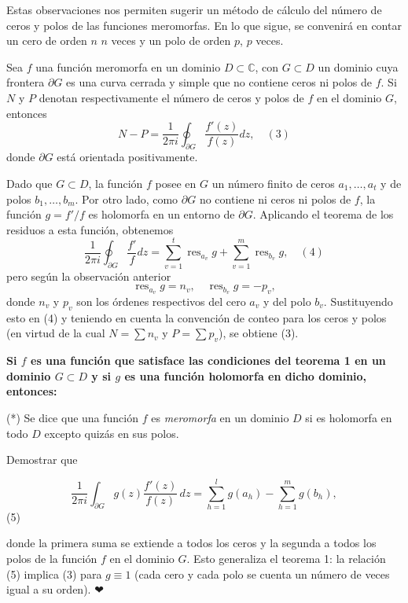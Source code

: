 \documentclass{article}
\begin{document}
Estas observaciones nos permiten sugerir un método de cálculo del número de ceros y polos de las funciones meromorfas. En lo que sigue, se convenirá en contar un cero de orden \( n \) \( n \) veces y un polo de orden \( p \), \( p \) veces.  

Sea \( f \) una función meromorfa en un dominio \( D \subset \mathbb{C} \), con \( G \subset D \) un dominio cuya frontera \( \partial G \) es una curva cerrada y simple que no contiene ceros ni polos de \( f \). Si \( N \) y \( P \) denotan respectivamente el número de ceros y polos de \( f \) en el dominio \( G \), entonces  
\[
N - P = \frac{1}{2\pi i} \oint_{\partial G} \frac{f'(z)}{f(z)} dz, \quad (3)
\]
donde \( \partial G \) está orientada positivamente.  

Dado que \( G \subset D \), la función \( f \) posee en \( G \) un número finito de ceros \( a_1, \dots, a_t \) y de polos \( b_1, \dots, b_m \). Por otro lado, como \( \partial G \) no contiene ni ceros ni polos de \( f \), la función \( g = f'/f \) es holomorfa en un entorno de \( \partial G \). Aplicando el teorema de los residuos a esta función, obtenemos  
\[
\frac{1}{2\pi i} \oint_{\partial G} \frac{f'}{f} dz = \sum_{v=1}^{t} \operatorname{res}_{a_v} g + \sum_{v=1}^{m} \operatorname{res}_{b_v} g, \quad (4)
\]
pero según la observación anterior  
\[
\operatorname{res}_{a_v} g = n_v, \quad \operatorname{res}_{b_v} g = - p_v,
\]
donde \( n_v \) y \( p_v \) son los órdenes respectivos del cero \( a_v \) y del polo \( b_v \). Sustituyendo esto en (4) y teniendo en cuenta la convención de conteo para los ceros y polos (en virtud de la cual \( N = \sum n_v \) y \( P = \sum p_v \)), se obtiene (3).  

\textbf{Si \( f \) es una función que satisface las condiciones del teorema 1 en un dominio \( G \subset D \) y si \( g \) es una función holomorfa en dicho dominio, entonces:}

\begin{center}
(*) Se dice que una función \( f \) es \textit{meromorfa} en un dominio \( D \) si es holomorfa en todo \( D \) excepto quizás en sus polos.
\end{center}

Demostrar que

\[\frac{1}{2\pi i}\int_{\partial G} g(z) \frac{f'(z)}{f(z)}\, dz = \sum_{h=1}^{l} g(a_h) - \sum_{h=1}^{m} g(b_h),\] 
(5)

donde la primera suma se extiende a todos los ceros y la segunda a todos los polos de la función \(f\) en el dominio \(G\). Esto generaliza el teorema 1: la relación (5) implica (3) para \(g \equiv 1\) (cada cero y cada polo se cuenta un número de veces igual a su orden). ❤
\end{document}
